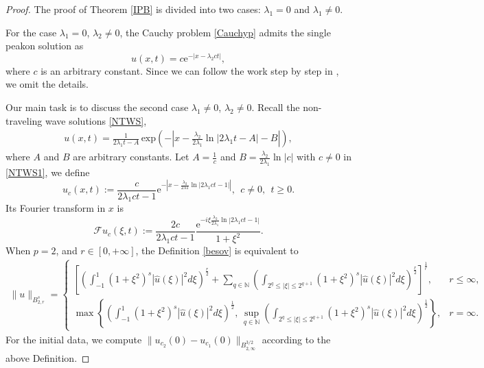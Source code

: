 \documentclass[11pt]{article}
\begin{document}
\begin{proof}
The proof of Theorem \ref{IPB} is divided into two cases: \(\lambda_1 = 0\) and \(\lambda_1 \neq 0\).

For the case \(\lambda_1 = 0\), \(\lambda_2 \neq0\), the Cauchy problem \eqref{Cauchyp} admits the single peakon solution as
\begin{equation*}
u(x,t) = c \mathrm{e}^{-|x - \lambda_2ct|},
\end{equation*}
where \(c\) is an arbitrary constant.
Since we can follow the work step by step in \cite{Dan2003}, we omit the details. 

Our main task is to discuss the second case \(\lambda_1\neq 0\), \(\lambda_2 \neq0\).  Recall the non-traveling wave solutions \eqref{NTWS},
\begin{eqnarray}\label{NTWS1}
u(x,t) = \frac{1}{2\lambda_1 t - A}\, \mathrm{exp}\left(-\left| x - \frac{\lambda_2}{2\lambda_1} \ln|2\lambda_1 t - A|- B \right|\right),
\end{eqnarray}
where \( A \) and \( B \) are arbitrary constants.
Let $A=\frac{1}{c}$ and $B=\frac{\lambda_2}{2\lambda_1}\ln|c|$ with $c\neq0$ in \eqref{NTWS1}, we define
\begin{equation*}
u_c(x,t):=\frac{c}{2\lambda_1ct-1}\mathrm{e}^{-\left|x-\frac{\lambda_2}{2\lambda1}\ln|2\lambda_1ct-1|\right|}, ~~c\neq0,~~ t\geq0.
\end{equation*}
Its Fourier transform in $x$ is
\begin{equation*}
\mathscr{F}u_c(\xi,t):=\frac{2c}{2\lambda_1ct-1}\frac{\mathrm{e}^{-i\xi \frac{\lambda_2}{2\lambda_1}\ln|2\lambda_1ct-1|}}{1+\xi^2}.
\end{equation*}
When $p=2$, and $r\in[0,+\infty]$, the Definition \ref{besov} is equivalent to
\begin{eqnarray*}
\|u\|_{B_{2,r}^s}=\left\{
  \begin{array}{ll}
  \left[\left(\int_{-1}^1(1+\xi^2)^s|\hat{u}(\xi)|^2d\xi\right)^{\frac{r}{2}}
+\sum\limits_{q\in\mathbb{N}}\left(\int_{2^q\leq|\xi|\leq2^{q+1}}(1+\xi^2)^s
|\hat{u}(\xi)|^2d\xi\right)^{\frac{r}{2}}\right]^{\frac{1}{r}}, & r\leq\infty, \\
   \max\left\{\left(\int_{-1}^1(1+\xi^2)^s|\hat{u}(\xi)|^2d\xi\right)^{\frac{1}{2}}, \, \sup\limits_{q\in\mathbb{N}} \left(\int_{2^q\leq|\xi|\leq2^{q+1}}(1+\xi^2)^s
|\hat{u}(\xi)|^2d\xi\right)^{\frac{1}{2}}\right\}, & r=\infty.
  \end{array}
\right.
\end{eqnarray*}
For the initial data, we compute $\|u_{c_2}(0)-u_{c_1}(0)\|_{B_{2,\infty}^{3/2}}$ according to the above Definition.

\end{proof}
\end{document}
